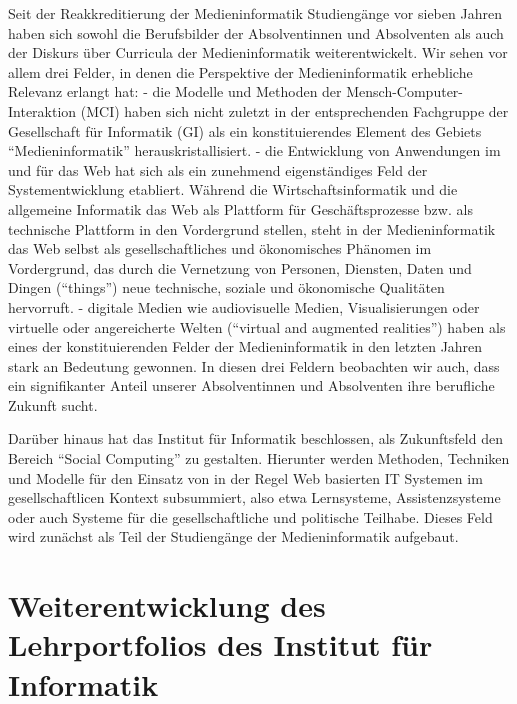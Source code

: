 Seit der Reakkreditierung der Medieninformatik Studiengänge vor sieben
Jahren haben sich sowohl die Berufsbilder der Absolventinnen und
Absolventen als auch der Diskurs über Curricula der Medieninformatik
weiterentwickelt. Wir sehen vor allem drei Felder, in denen die
Perspektive der Medieninformatik erhebliche Relevanz erlangt hat: - die
Modelle und Methoden der Mensch-Computer-Interaktion (MCI) haben sich
nicht zuletzt in der entsprechenden Fachgruppe der Gesellschaft für
Informatik (GI) als ein konstituierendes Element des Gebiets
``Medieninformatik'' herauskristallisiert. - die Entwicklung von
Anwendungen im und für das Web hat sich als ein zunehmend eigenständiges
Feld der Systementwicklung etabliert. Während die Wirtschaftsinformatik
und die allgemeine Informatik das Web als Plattform für
Geschäftsprozesse bzw. als technische Plattform in den Vordergrund
stellen, steht in der Medieninformatik das Web selbst als
gesellschaftliches und ökonomisches Phänomen im Vordergrund, das durch
die Vernetzung von Personen, Diensten, Daten und Dingen (``things'')
neue technische, soziale und ökonomische Qualitäten hervorruft. -
digitale Medien wie audiovisuelle Medien, Visualisierungen oder
virtuelle oder angereicherte Welten (``virtual and augmented
realities'') haben als eines der konstituierenden Felder der
Medieninformatik in den letzten Jahren stark an Bedeutung gewonnen. In
diesen drei Feldern beobachten wir auch, dass ein signifikanter Anteil
unserer Absolventinnen und Absolventen ihre berufliche Zukunft sucht.

Darüber hinaus hat das Institut für Informatik beschlossen, als
Zukunftsfeld den Bereich ``Social Computing'' zu gestalten. Hierunter
werden Methoden, Techniken und Modelle für den Einsatz von in der Regel
Web basierten IT Systemen im gesellschaftlicen Kontext subsummiert, also
etwa Lernsysteme, Assistenzsysteme oder auch Systeme für die
gesellschaftliche und politische Teilhabe. Dieses Feld wird zunächst als
Teil der Studiengänge der Medieninformatik aufgebaut.

\section{Weiterentwicklung des Lehrportfolios des Institut für
Informatik\label{/mi-2017/selbstbericht/0150-soll-zustand-geplante-veraenderungen/0000-geplante-veraenderungen-bachelor}}\label{weiterentwicklung-des-lehrportfolios-des-institut-fuxfcr-informatikpathlabelmi-2017selbstbericht0150-soll-zustand-geplante-veraenderungen0000-geplante-veraenderungen-bachelor}

